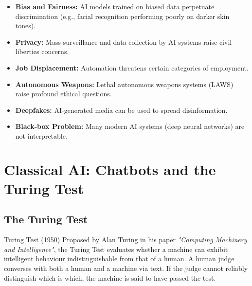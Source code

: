 \documentclass[12pt,a4paper]{report}
\begin{document}
\begin{itemize}
  \item \textbf{Bias and Fairness:} AI models trained on biased data perpetuate discrimination (e.g., facial recognition performing poorly on darker skin tones).
  \item \textbf{Privacy:} Mass surveillance and data collection by AI systems raise civil liberties concerns.
  \item \textbf{Job Displacement:} Automation threatens certain categories of employment.
  \item \textbf{Autonomous Weapons:} Lethal autonomous weapons systems (LAWS) raise profound ethical questions.
  \item \textbf{Deepfakes:} AI-generated media can be used to spread disinformation.
  \item \textbf{Black-box Problem:} Many modern AI systems (deep neural networks) are not interpretable.
\end{itemize}

\chapter{Classical AI: Chatbots and the Turing Test}

\section{The Turing Test}

\begin{defbox}{Turing Test (1950)}
Proposed by Alan Turing in his paper \textit{"Computing Machinery and Intelligence"}, the Turing Test evaluates whether a machine can exhibit intelligent behaviour indistinguishable from that of a human. A human judge converses with both a human and a machine via text. If the judge cannot reliably distinguish which is which, the machine is said to have passed the test.
\end{defbox}
\end{document}
